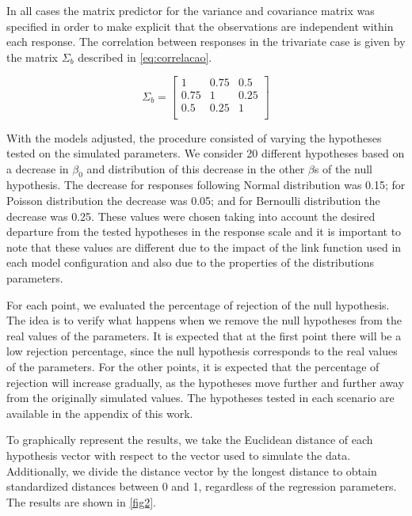 \documentclass[AMA,STIX1COL]{WileyNJD-v2}
\begin{document}
In all cases the matrix predictor for the variance and covariance matrix was specified in order to make explicit that the observations are independent within each response. The correlation between responses in the trivariate case is given by the matrix $\Sigma_b$ described in \autoref{eq:correlacao}.

\begin{equation} \label{eq:correlacao}
\Sigma_b = 
\begin{bmatrix}
1    & 0.75 & 0.5  \\
0.75 & 1    & 0.25 \\
0.5  & 0.25 & 1    \\
\end{bmatrix}
\end{equation}

With the models adjusted, the procedure consisted of varying the hypotheses tested on the simulated parameters. We consider 20 different hypotheses based on a decrease in $\beta_0$ and distribution of this decrease in the other $\beta$s of the null hypothesis. The decrease for responses following Normal distribution was 0.15; for Poisson distribution the decrease was 0.05; and for Bernoulli distribution the decrease was 0.25. These values were chosen taking into account the desired departure from the tested hypotheses in the response scale and it is important to note that these values are different due to the impact of the link function used in each model configuration and also due to the properties of the distributions parameters.

For each point, we evaluated the percentage of rejection of the null hypothesis. The idea is to verify what happens when we remove the null hypotheses from the real values of the parameters. It is expected that at the first point there will be a low rejection percentage, since the null hypothesis corresponds to the real values of the parameters. For the other points, it is expected that the percentage of rejection will increase gradually, as the hypotheses move further and further away from the originally simulated values. The hypotheses tested in each scenario are available in the appendix of this work.
 
To graphically represent the results, we take the Euclidean distance of each hypothesis vector with respect to the vector used to simulate the data. Additionally, we divide the distance vector by the longest distance to obtain standardized distances between 0 and 1, regardless of the regression parameters. The results are shown in \autoref{fig2}.
\end{document}
